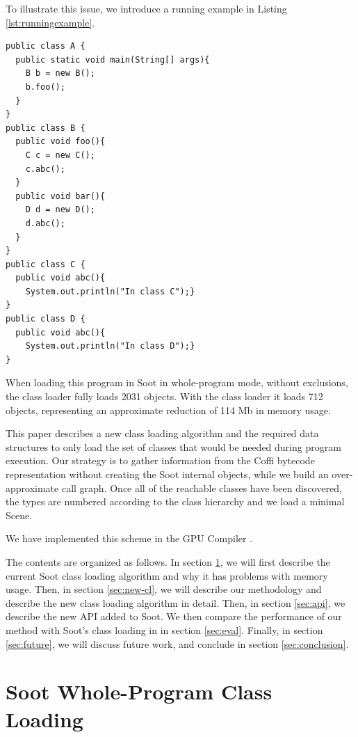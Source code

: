 \documentclass{sigplanconf}
\begin{document}
To illustrate this issue, we introduce a running example in Listing \ref{lst:runningexample}.

\begin{lstlisting}[caption={Running example},label={lst:runningexample},float=!ht]
public class A {
  public static void main(String[] args){
    B b = new B();
    b.foo();
  }
}
public class B {
  public void foo(){
    C c = new C();
    c.abc();
  }
  public void bar(){
    D d = new D();
    d.abc();
  }
}
public class C {
  public void abc(){
    System.out.println("In class C");}
}
public class D {
  public void abc(){
    System.out.println("In class D");}
}
\end{lstlisting}

When loading this program in Soot in whole-program mode, without exclusions, the class loader fully loads 2031 \sootclass objects. With the \rb class loader it loads 712 \sootclass objects, representing an approximate reduction of 114 Mb in memory usage.

This paper describes a new class loading algorithm and the required data structures to only load the set of classes that would be needed during program execution. Our strategy is to gather information from the Coffi bytecode representation without creating the Soot internal objects, while we build an over-approximate call graph. Once all of the reachable classes have been discovered, the types are numbered according to the class hierarchy and we load a minimal Scene.

We have implemented this scheme in the \rb GPU Compiler \cite{rootbeer}. 

The contents are organized as follows. In section \ref{sec:soot-cl}, we will first describe the current Soot class loading algorithm and why it has problems with memory usage. Then, in section \ref{sec:new-cl}, we will describe our methodology and describe the new class loading algorithm in detail. Then, in section \ref{sec:api}, we describe the new API added to Soot. We then compare the performance of our method with Soot's class loading in \rb in section \ref{sec:eval}. Finally, in section \ref{sec:future}, we will discuss future work, and conclude in section \ref{sec:conclusion}.

\section{Soot Whole-Program Class Loading}
\label{sec:soot-cl}
\end{document}
